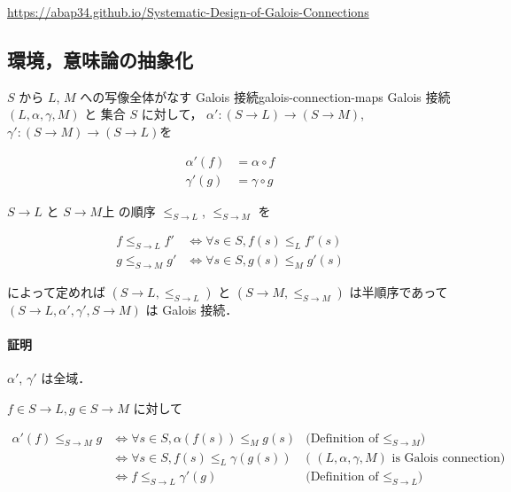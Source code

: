 \documentclass[uplatex]{jsarticle}
\begin{document}
\url{https://abap34.github.io/Systematic-Design-of-Galois-Connections}

\subsection{環境，意味論の抽象化}

\begin{boxtheorem}{$S$ から $L$, $M$ への写像全体がなす Galois 接続}{galois-connection-maps}
  Galois 接続 $(L, \alpha, \gamma, M)$ と 集合 $S$ に対して，
  $\alpha': (S \to L) \to (S \to M)$,$\gamma': (S \to M) \to (S \to L)$を

  \begin{align*}
    \alpha'(f) & = \alpha \circ f \\
    \gamma'(g) & = \gamma \circ g
  \end{align*}

  $S \to L$ と $S \to M$上 の順序 $\leq_{S \to L}$, $\leq_{S \to M}$ を

  \begin{align*}
    f \leq_{S \to L} f' & \iff \forall s \in S, f(s) \leq_L f'(s) \\
    g \leq_{S \to M} g' & \iff \forall s \in S, g(s) \leq_M g'(s)
  \end{align*}

  によって定めれば $(S \to L, \leq_{S \to L})$ と $(S \to M, \leq_{S \to M})$ は半順序であって
  $(S \to L, \alpha', \gamma', S \to M)$ は Galois 接続．
\end{boxtheorem}

\paragraph*{証明}

$\alpha'$, $\gamma'$ は全域．


$f \in S \to L, g \in S \to M$ に対して

\begin{align*}
  \alpha'(f) \leq_{S \to M} g & \iff \forall s \in S, \alpha(f(s)) \leq_M g(s) & \text{(Definition of $\leq_{S \to M}$)}                 \\
                              & \iff \forall s \in S, f(s) \leq_L \gamma(g(s)) & \text{( $(L, \alpha, \gamma, M)$ is Galois connection)} \\
                              & \iff f \leq_{S \to L} \gamma'(g)               & \text{(Definition of $\leq_{S \to L}$)}                 \\
  \\
\end{align*}
\end{document}
